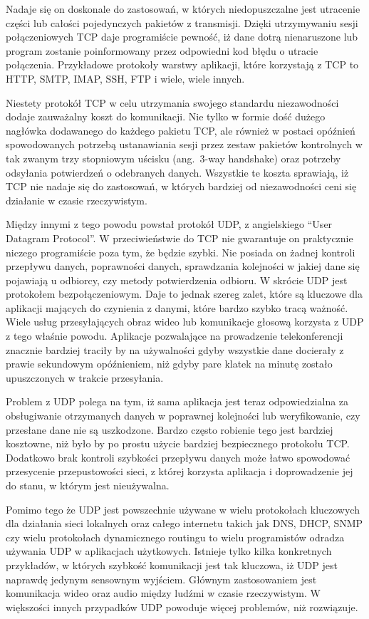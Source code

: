\documentclass[11pt]{scrartcl}
\begin{document}
Nadaje się on doskonale do zastosowań, w których niedopuszczalne jest utracenie części lub całości pojedynczych pakietów z transmisji. Dzięki utrzymywaniu sesji połączeniowych TCP daje programiście pewność, iż dane dotrą nienaruszone lub program zostanie poinformowany przez odpowiedni kod błędu o utracie połączenia. Przykładowe protokoły warstwy aplikacji, które korzystają z TCP to HTTP, SMTP, IMAP, SSH, FTP i wiele, wiele innych.

Niestety protokół TCP w celu utrzymania swojego standardu niezawodności dodaje zauważalny koszt do komunikacji. Nie tylko w formie dość dużego nagłówka dodawanego do każdego pakietu TCP, ale również w postaci opóźnień spowodowanych potrzebą ustanawiania sesji przez zestaw pakietów kontrolnych w tak zwanym trzy stopniowym uścisku (ang.\ 3-way handshake) oraz potrzeby odsyłania potwierdzeń o odebranych danych. Wszystkie te koszta sprawiają, iż TCP nie nadaje się do zastosowań, w których bardziej od niezawodności ceni się działanie w czasie rzeczywistym.

Między innymi z tego powodu powstał protokół UDP, z angielskiego ``User Datagram Protocol''. W przeciwieństwie do TCP nie gwarantuje on praktycznie niczego programiście poza tym, że będzie szybki. Nie posiada on żadnej kontroli przepływu danych, poprawności danych, sprawdzania kolejności w jakiej dane się pojawiają u odbiorcy, czy metody potwierdzenia odbioru. W skrócie UDP jest protokołem bezpołączeniowym. Daje to jednak szereg zalet, które są kluczowe dla aplikacji mających do czynienia z danymi, które bardzo szybko tracą ważność. Wiele usług przesyłających obraz wideo lub komunikacje głosową korzysta z UDP z tego właśnie powodu. Aplikacje pozwalające na prowadzenie telekonferencji znacznie bardziej traciły by na używalności gdyby wszystkie dane docierały z prawie sekundowym opóźnieniem, niż gdyby pare klatek na minutę zostało upuszczonych w trakcie przesyłania.

Problem z UDP polega na tym, iż sama aplikacja jest teraz odpowiedzialna za obsługiwanie otrzymanych danych w poprawnej kolejności lub weryfikowanie, czy przesłane dane nie są uszkodzone. Bardzo często robienie tego jest bardziej kosztowne, niż było by po prostu użycie bardziej bezpiecznego protokołu TCP\@. Dodatkowo brak kontroli szybkości przepływu danych może łatwo spowodować przesycenie przepustowości sieci, z której korzysta aplikacja i doprowadzenie jej do stanu, w którym jest nieużywalna.

Pomimo tego że UDP jest powszechnie używane w wielu protokołach kluczowych dla działania sieci lokalnych oraz całego internetu takich jak DNS, DHCP, SNMP czy wielu protokołach dynamicznego routingu to wielu programistów odradza używania UDP w aplikacjach użytkowych. Istnieje tylko kilka konkretnych przykładów, w których szybkość komunikacji jest tak kluczowa, iż UDP jest naprawdę jedynym sensownym wyjściem. Głównym zastosowaniem jest komunikacja wideo oraz audio między ludźmi w czasie rzeczywistym. W większości innych przypadków UDP powoduje więcej problemów, niż rozwiązuje.
\end{document}
